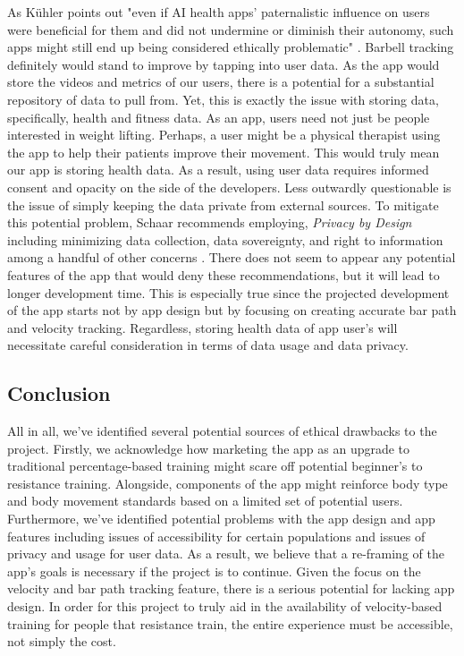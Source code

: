 \documentclass[10pt,twocolumn]{article}
\begin{document}
As Kühler points out "even if AI health apps’ paternalistic influence on users were beneficial for them and did not undermine or diminish their autonomy, such apps might still end up being considered ethically problematic" \cite{Kuhler2022}. Barbell tracking definitely would stand to improve by tapping into user data. As the app would store the videos and metrics of our users, there is a potential for a substantial repository of data to pull from. Yet, this is exactly the issue with storing data, specifically, health and fitness data. As an app, users need not just be people interested in weight lifting. Perhaps, a user might be a physical therapist using the app to help their patients improve their movement. This would truly mean our app is storing health data. As a result, using user data requires informed consent and opacity on the side of the developers. Less outwardly questionable is the issue of simply keeping the data private from external sources. To mitigate this potential problem, Schaar recommends employing, \textit{Privacy by Design} including minimizing data collection, data sovereignty, and right to information among a handful of other concerns \cite{Schaar2010}. There does not seem to appear any potential features of the app that would deny these recommendations, but it will lead to longer development time. This is especially true since the projected development of the app starts not by app design but by focusing on creating accurate bar path and velocity tracking. Regardless, storing health data of app user's will necessitate careful consideration in terms of data usage and data privacy.

\subsection{Conclusion}
All in all, we've identified several potential sources of ethical drawbacks to the project. Firstly, we acknowledge how marketing the app as an upgrade to traditional percentage-based training might scare off potential beginner's to resistance training. Alongside, components of the app might reinforce body type and body movement standards based on a limited set of potential users. Furthermore, we've identified potential problems with the app design and app features including issues of accessibility for certain populations and issues of privacy and usage for user data. As a result, we believe that a re-framing of the app's goals is necessary if the project is to continue. Given the focus on the velocity and bar path tracking feature, there is a serious potential for lacking app design. In order for this project to truly aid in the availability of velocity-based training for people that resistance train, the entire experience must be accessible, not simply the cost.

\printbibliography 
\end{document}
